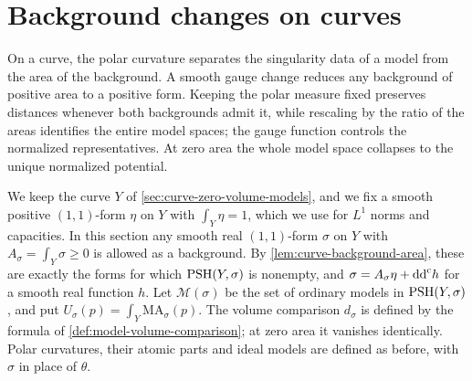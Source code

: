 

\section{Background changes on curves}
\label{sec:curve-model-backgrounds}

On a curve, the polar curvature separates the singularity data of a model from the area of the background. A smooth gauge change reduces any background of positive area to a positive form. Keeping the polar measure fixed preserves distances whenever both backgrounds admit it, while rescaling by the ratio of the areas identifies the entire model spaces; the gauge function controls the normalized representatives. At zero area the whole model space collapses to the unique normalized potential.

We keep the curve $Y$ of \cref{sec:curve-zero-volume-models}, and we fix a smooth positive $(1,1)$-form $\eta$ on $Y$ with $\int_Y\eta=1$, which we use for $L^1$ norms and capacities. In this section any smooth real $(1,1)$-form $\sigma$ on $Y$ with $A_\sigma=\int_Y\sigma\geq0$ is allowed as a background. By \cref{lem:curve-background-area}, these are exactly the forms for which $\mathrm{PSH}(Y,\sigma)$ is nonempty, and $\sigma=A_\sigma\eta+\mathrm{dd}^{\mathrm{c}} h$ for a smooth real function $h$. Let $\mathcal M(\sigma)$ be the set of ordinary models in $\mathrm{PSH}(Y,\sigma)$, and put $U_\sigma(p)=\int_Y\mathrm{MA}_\sigma(p)$. The volume comparison $d_\sigma$ is defined by the formula of \cref{def:model-volume-comparison}; at zero area it vanishes identically. Polar curvatures, their atomic parts and ideal models are defined as before, with $\sigma$ in place of $\theta$.

